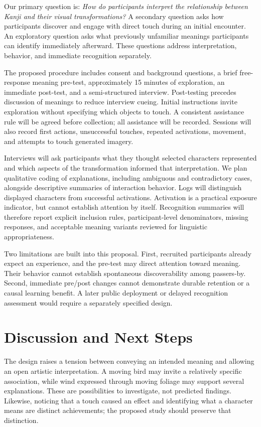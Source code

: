 \documentclass[manuscript,review,anonymous]{acmart}
\begin{document}
Our primary question is: \emph{How do participants interpret the relationship between Kanji and their visual transformations?} A secondary question asks how participants discover and engage with direct touch during an initial encounter. An exploratory question asks what previously unfamiliar meanings participants can identify immediately afterward. These questions address interpretation, behavior, and immediate recognition separately.

The proposed procedure includes consent and background questions, a brief free-response meaning pre-test, approximately 15 minutes of exploration, an immediate post-test, and a semi-structured interview. Post-testing precedes discussion of meanings to reduce interview cueing. Initial instructions invite exploration without specifying which objects to touch. A consistent assistance rule will be agreed before collection; all assistance will be recorded. Sessions will also record first actions, unsuccessful touches, repeated activations, movement, and attempts to touch generated imagery.

Interviews will ask participants what they thought selected characters represented and which aspects of the transformation informed that interpretation. We plan qualitative coding of explanations, including ambiguous and contradictory cases, alongside descriptive summaries of interaction behavior. Logs will distinguish displayed characters from successful activations. Activation is a practical exposure indicator, but cannot establish attention by itself. Recognition summaries will therefore report explicit inclusion rules, participant-level denominators, missing responses, and acceptable meaning variants reviewed for linguistic appropriateness.

Two limitations are built into this proposal. First, recruited participants already expect an experience, and the pre-test may direct attention toward meaning. Their behavior cannot establish spontaneous discoverability among passers-by. Second, immediate pre/post changes cannot demonstrate durable retention or a causal learning benefit. A later public deployment or delayed recognition assessment would require a separately specified design.

\section{Discussion and Next Steps}
The design raises a tension between conveying an intended meaning and allowing an open artistic interpretation. A moving bird may invite a relatively specific association, while wind expressed through moving foliage may support several explanations. These are possibilities to investigate, not predicted findings. Likewise, noticing that a touch caused an effect and identifying what a character means are distinct achievements; the proposed study should preserve that distinction.
\end{document}
